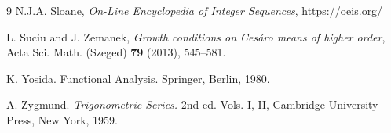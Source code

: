 \documentclass[a4paper,12pt]{amsart}
\theoremstyle{definition}
\theoremstyle{remark}
\begin{document}
\begin{thebibliography}{9}
   N.J.A. Sloane,   {\it On-Line Encyclopedia of Integer Sequences}, https://oeis.org/

 L. Suciu and J. Zemanek, {\it Growth conditions on Cesáro means of higher order}, Acta Sci. Math. (Szeged) \textbf{79}
(2013), 545--581.






 K. Yosida. {Functional Analysis.} Springer, Berlin,  1980.

 A. Zygmund. {\it Trigonometric Series.} 2nd ed. Vols. I, II, Cambridge University Press, New York, 1959.








\end{thebibliography}
\end{document}
